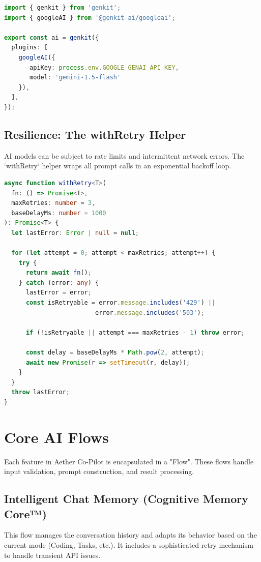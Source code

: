 \begin{lstlisting}[language=TypeScript, caption=Genkit Initialization (src/ai/genkit.ts)]
import { genkit } from 'genkit';
import { googleAI } from '@genkit-ai/googleai';

export const ai = genkit({
  plugins: [
    googleAI({
       apiKey: process.env.GOOGLE_GENAI_API_KEY,
       model: 'gemini-1.5-flash'
    }),
  ],
});
\end{lstlisting}

\subsection{Resilience: The withRetry Helper}
AI models can be subject to rate limits and intermittent network errors. The `withRetry` helper wraps all prompt calls in an exponential backoff loop.

\begin{lstlisting}[language=TypeScript, caption=Exponential Backoff Logic (src/ai/flows/intelligent-chat-memory.ts)]
async function withRetry<T>(
  fn: () => Promise<T>,
  maxRetries: number = 3,
  baseDelayMs: number = 1000
): Promise<T> {
  let lastError: Error | null = null;

  for (let attempt = 0; attempt < maxRetries; attempt++) {
    try {
      return await fn();
    } catch (error: any) {
      lastError = error;
      const isRetryable = error.message.includes('429') ||
                         error.message.includes('503');

      if (!isRetryable || attempt === maxRetries - 1) throw error;

      const delay = baseDelayMs * Math.pow(2, attempt);
      await new Promise(r => setTimeout(r, delay));
    }
  }
  throw lastError;
}
\end{lstlisting}

\newpage

\section{Core AI Flows}

Each feature in Aether Co-Pilot is encapsulated in a "Flow". These flows handle input validation, prompt construction, and result processing.

\subsection{Intelligent Chat Memory (Cognitive Memory Core™)}
This flow manages the conversation history and adapts its behavior based on the current mode (Coding, Tasks, etc.). It includes a sophisticated retry mechanism to handle transient API issues.


